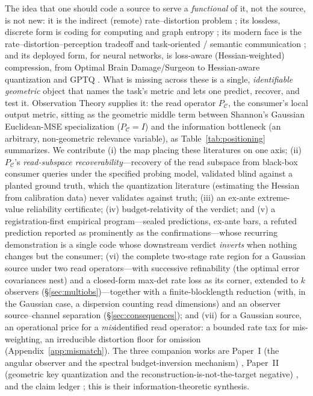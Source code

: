\documentclass[lettersize,onecolumn]{IEEEtran}
\theoremstyle{definition}
\theoremstyle{remark}
\newcommand{\PC}{P_{\mathcal{C}}}
\begin{document}
The idea that one should code a source to serve a \emph{functional} of it, not the
source, is not new: it is the indirect (remote) rate--distortion problem
\cite{dobrushin1962,wolfziv1970,witsenhausen1980}; its lossless, discrete form is
coding for computing and graph entropy \cite{korner1973,orlitsky2001}; its modern
face is the rate--distortion--perception tradeoff \cite{blau2019} and task-oriented
/ semantic communication \cite{gunduz2023}; and its deployed form, for neural
networks, is loss-aware (Hessian-weighted) compression, from Optimal Brain
Damage/Surgeon \cite{lecun1990,hassibi1993} to Hessian-aware quantization and GPTQ
\cite{dong2019hawq,frantar2023gptq}. What is missing across these is a single,
\emph{identifiable geometric} object that names the task's metric and lets one
predict, recover, and test it. Observation Theory supplies it: the read operator
$\PC$, the consumer's local output metric, sitting as the geometric middle term
between Shannon's Gaussian Euclidean-MSE specialization ($\PC=I$) and the information
bottleneck \cite{tishby1999} (an arbitrary, non-geometric relevance variable), as
Table~\ref{tab:positioning} summarizes. We
contribute (i) the map placing these literatures on one axis; (ii) $\PC$'s
\emph{read-subspace recoverability}---recovery of the read subspace from black-box
consumer queries under the specified probing model, validated blind against a
planted ground truth, which the quantization literature (estimating the Hessian from
calibration data) never validates against truth; (iii) an ex-ante extreme-value
reliability certificate; (iv) budget-relativity of the verdict; and (v) a
registration-first empirical program---sealed predictions, ex-ante bars, a refuted
prediction reported as prominently as the confirmations---whose recurring
demonstration is a single code whose downstream verdict \emph{inverts} when nothing
changes but the consumer; (vi) the complete two-stage rate region for a Gaussian source
under two read operators---with successive refinability (the optimal error covariances
nest) and a
closed-form max-det rate loss as its corner, extended to $k$ observers
(\S\ref{sec:multiobs})---together with a finite-blocklength reduction (with, in the
Gaussian case, a dispersion counting read dimensions) and an observer source--channel
separation (\S\ref{sec:consequences}); and (vii) for a Gaussian source, an operational
price for a \emph{mis}identified read operator: a bounded rate tax for mis-weighting, an
irreducible distortion floor for omission (Appendix~\ref{app:mismatch}).
The three companion works are Paper~I (the angular observer and the spectral
budget-inversion mechanism) \cite{paper1}, Paper~II (geometric key quantization and
the reconstruction-is-not-the-target negative) \cite{paper2}, and the claim ledger
\cite{ledger2026}; this is their information-theoretic synthesis.
\end{document}
